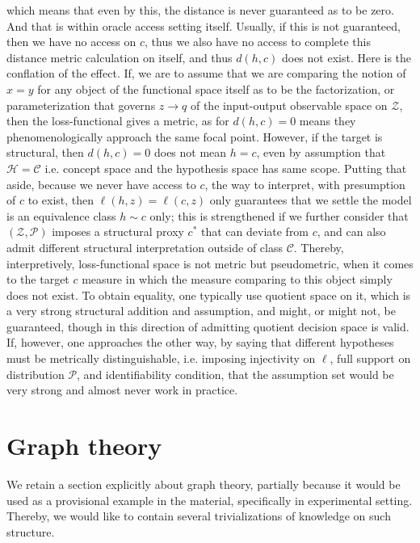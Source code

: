 which means that even by this, the distance is never guaranteed as to be zero. And that is within oracle access setting itself. Usually, if this is not guaranteed, then we have no access on $c$, thus we also have no access to complete this distance metric calculation on itself, and thus $d(h,c)$ does not exist. Here is the conflation of the effect. If, we are to assume that we are comparing the notion of $x=y$ for any object of the functional space itself as to be the factorization, or parameterization that governs $z\to q$ of the input-output observable space on $\mathcal{Z}$, then the loss-functional gives a metric, as for $d(h,c)=0$ means they phenomenologically approach the same focal point. However, if the target is structural, then $d(h,c)=0$ does not mean $h=c$, even by assumption that $\mathcal{H}=\mathcal{C}$ i.e. concept space and the hypothesis space has same scope. Putting that aside, because we never have access to $c$, the way to interpret, with presumption of $c$ to exist, then $\ell(h,z)=\ell(c,z)$ only guarantees that we settle the model is an equivalence class $h\sim c$ only; this is strengthened if we further consider that $(\mathcal{Z},\mathcal{P})$ imposes a structural proxy $c^{*}$ that can deviate from $c$, and can also admit different structural interpretation outside of class $\mathcal{C}$. Thereby, interpretively, loss-functional space is not metric but pseudometric, when it comes to the target $c$ measure in which the measure comparing to this object simply does not exist. To obtain equality, one typically use quotient space on it, which is a very strong structural addition and assumption, and might, or might not, be guaranteed, though in this direction of admitting quotient decision space is valid. If, however, one approaches the other way, by saying that different hypotheses must be metrically distinguishable, i.e. imposing injectivity on $\ell$, full support on distribution $\mathcal{P}$, and identifiability condition, that the assumption set would be very strong and almost never work in practice. 

\section{Graph theory}

We retain a section explicitly about graph theory, partially because it would be used as a provisional example in the material, specifically in experimental setting. Thereby, we would like to contain several trivializations of knowledge on such structure. 

